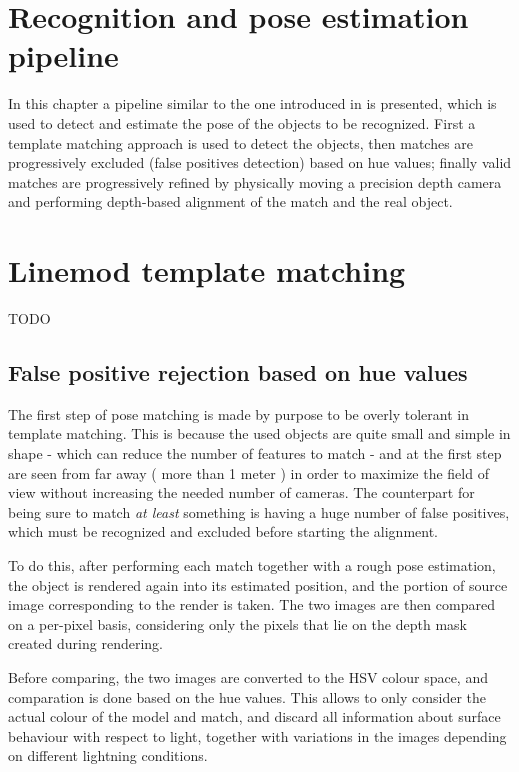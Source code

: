 \section{Recognition and pose estimation pipeline}

In this chapter a pipeline similar to the one introduced in
\cite{linemod-pipeline} is presented, which is used to detect and estimate
the pose of the objects to be recognized. First a template matching approach is
used to detect the objects, then matches are progressively excluded (false
positives detection) based on hue values; finally valid matches are
progressively refined by physically moving a precision depth camera and
performing depth-based alignment of the match and the real object.

\section{Linemod template matching}
TODO

\subsection{False positive rejection based on hue values}
The first step of pose matching is made by purpose to be overly tolerant in
template matching. This is because the used objects are quite small and simple
in shape - which can reduce the number of features to match - and at the first
step are seen from far away ( more than 1 meter ) in order to maximize the
field of view without increasing the needed number of cameras. The counterpart
for being sure to match \emph{at least} something is having a huge number of
  false positives, which must be recognized and excluded before starting the
  alignment.


To do this, after performing each match together with a rough pose estimation,
the object is rendered again into its estimated position, and the portion of
source image corresponding to the render is taken. The two images are then
compared on a per-pixel basis, considering only the pixels that lie on the
depth mask created during rendering. 

Before comparing, the two images are converted to the HSV colour space, and
comparation is done based on the hue values. This allows to only consider the
actual colour of the model and match, and discard all information about
surface behaviour with respect to light, together with variations in the images
depending on different lightning conditions.

